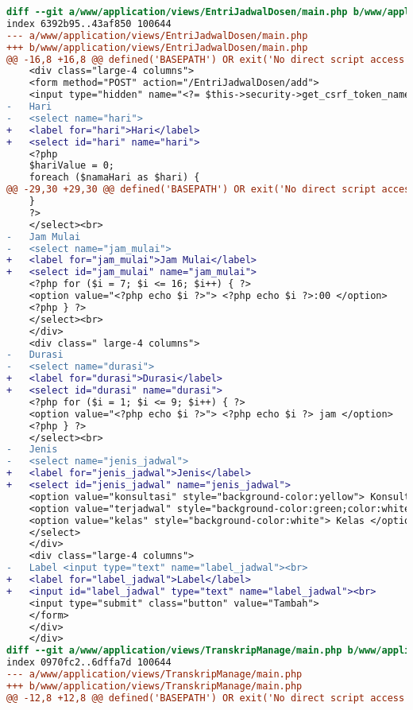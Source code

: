 \begin{lstlisting}[frame=single, label={lst:perbaikan_3.3.2_label_masukan}, language=diff, caption=Perbaikan Kriteria Sukses 3.3.2 - Tidak Terdapat Label pada Kolom Masukan]
diff --git a/www/application/views/EntriJadwalDosen/main.php b/www/application/views/EntriJadwalDosen/main.php
index 6392b95..43af850 100644
--- a/www/application/views/EntriJadwalDosen/main.php
+++ b/www/application/views/EntriJadwalDosen/main.php
@@ -16,8 +16,8 @@ defined('BASEPATH') OR exit('No direct script access allowed');
    <div class="large-4 columns">
    <form method="POST" action="/EntriJadwalDosen/add">
    <input type="hidden" name="<?= $this->security->get_csrf_token_name() ?>" value="<?= $this->security->get_csrf_hash() ?>" />
-   Hari
-   <select name="hari"> 
+   <label for="hari">Hari</label>
+   <select id="hari" name="hari"> 
    <?php
    $hariValue = 0;
    foreach ($namaHari as $hari) {
@@ -29,30 +29,30 @@ defined('BASEPATH') OR exit('No direct script access allowed');
    }
    ?>
    </select><br>
-   Jam Mulai
-   <select name="jam_mulai"> 
+   <label for="jam_mulai">Jam Mulai</label>
+   <select id="jam_mulai" name="jam_mulai">  
    <?php for ($i = 7; $i <= 16; $i++) { ?>
    <option value="<?php echo $i ?>"> <?php echo $i ?>:00 </option>
    <?php } ?>
    </select><br>
    </div>
    <div class=" large-4 columns">
-   Durasi
-   <select name="durasi"> 
+   <label for="durasi">Durasi</label>
+   <select id="durasi" name="durasi">  
    <?php for ($i = 1; $i <= 9; $i++) { ?>
    <option value="<?php echo $i ?>"> <?php echo $i ?> jam </option>
    <?php } ?>
    </select><br>
-   Jenis  
-   <select name="jenis_jadwal"> 
+   <label for="jenis_jadwal">Jenis</label>
+   <select id="jenis_jadwal" name="jenis_jadwal">  
    <option value="konsultasi" style="background-color:yellow"> Konsultasi </option>
    <option value="terjadwal" style="background-color:green;color:white"> Terjadwal</option>
    <option value="kelas" style="background-color:white"> Kelas </option>
    </select>
    </div>
    <div class="large-4 columns">
-   Label <input type="text" name="label_jadwal"><br>
+   <label for="label_jadwal">Label</label>
+   <input id="label_jadwal" type="text" name="label_jadwal"><br>
    <input type="submit" class="button" value="Tambah">
    </form>
    </div>
    </div>
diff --git a/www/application/views/TranskripManage/main.php b/www/application/views/TranskripManage/main.php
index 0970fc2..6dffa7d 100644
--- a/www/application/views/TranskripManage/main.php
+++ b/www/application/views/TranskripManage/main.php
@@ -12,8 +12,8 @@ defined('BASEPATH') OR exit('No direct script access allowed');

\end{lstlisting}
